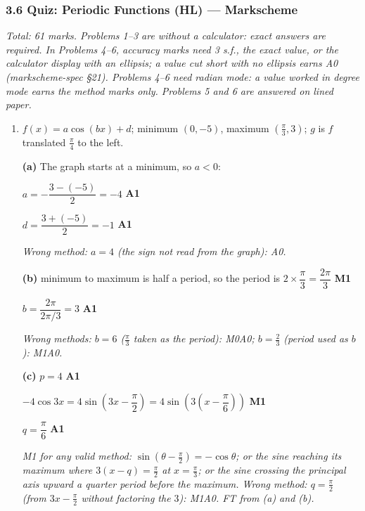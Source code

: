 \documentclass[12pt, twoside]{article}
\begin{document}
\subsubsection*{3.6 Quiz: Periodic Functions (HL) --- Markscheme}

\emph{Total: 61 marks. Problems 1--3 are without a calculator: exact answers
are required. In Problems 4--6, accuracy marks need 3 s.f., the exact value,
or the calculator display with an ellipsis; a value cut short with no
ellipsis earns A0 (markscheme-spec \S21). Problems 4--6 need radian mode: a
value worked in degree mode earns the method marks only. Problems 5 and 6
are answered on lined paper.}

\begin{enumerate}[itemsep=0.3cm]

\item[1.] [Maximum mark: 10]

$f(x) = a\cos(bx) + d$; minimum $(0, -5)$, maximum
$\left(\frac{\pi}{3}, 3\right)$; $g$ is $f$ translated $\frac{\pi}{4}$ to
the left.

\textbf{(a)} The graph starts at a minimum, so $a < 0$:

$a = -\dfrac{3 - (-5)}{2} = -4$ \hfill \textbf{A1}

$d = \dfrac{3 + (-5)}{2} = -1$ \hfill \textbf{A1}

\emph{Wrong method: $a = 4$ (the sign not read from the graph): A0.}

\textbf{(b)} minimum to maximum is half a period, so the period is
$2 \times \dfrac{\pi}{3} = \dfrac{2\pi}{3}$ \hfill \textbf{M1}

$b = \dfrac{2\pi}{2\pi/3} = 3$ \hfill \textbf{A1}

\emph{Wrong methods: $b = 6$ ($\frac{\pi}{3}$ taken as the period):
M0A0; $b = \frac{2}{3}$ (period used as $b$): M1A0.}

\textbf{(c)} $p = 4$ \hfill \textbf{A1}

$-4\cos 3x = 4\sin\left(3x - \dfrac{\pi}{2}\right)
= 4\sin\left(3\left(x - \dfrac{\pi}{6}\right)\right)$ \hfill \textbf{M1}

$q = \dfrac{\pi}{6}$ \hfill \textbf{A1}

\emph{M1 for any valid method: $\sin\left(\theta - \frac{\pi}{2}\right) =
-\cos\theta$; or the sine reaching its maximum where
$3(x - q) = \frac{\pi}{2}$ at $x = \frac{\pi}{3}$; or the sine crossing the
principal axis upward a quarter period before the maximum. Wrong method:
$q = \frac{\pi}{2}$ (from $3x - \frac{\pi}{2}$ without factoring the $3$):
M1A0. FT from (a) and (b).}


\end{enumerate}
\end{document}
